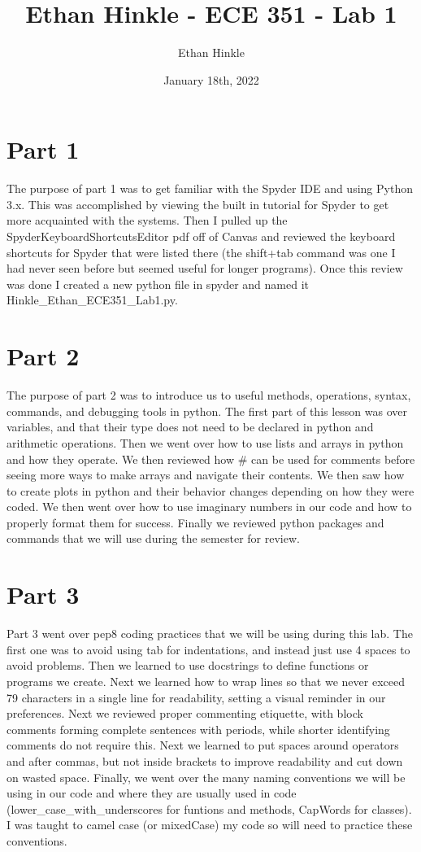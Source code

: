 \documentclass{article}
\title{Ethan Hinkle - ECE 351 - Lab 1}
\author{Ethan Hinkle}
\date{January 18th, 2022}
\begin{document}
\maketitle

\section{Part 1}
The purpose of part 1 was to get familiar with the Spyder IDE and using Python 3.x. This was accomplished by viewing the built in tutorial for Spyder to get more acquainted with the systems. Then I pulled up the SpyderKeyboardShortcutsEditor pdf off of Canvas and reviewed the keyboard shortcuts for Spyder that were listed there (the shift+tab command was one I had never seen before but seemed useful for longer programs). Once this review was done I created a new python file in spyder and named it Hinkle\_Ethan\_ECE351\_Lab1.py.
\section{Part 2}
The purpose of part 2 was to introduce us to useful methods, operations, syntax, commands, and debugging tools in python. The first part of this lesson was over variables, and that their type does not need to be declared in python and arithmetic operations. Then we went over how to use lists and arrays in python and how they operate. We then reviewed how \# can be used for comments before seeing more ways to make arrays and navigate their contents. We then saw how to create plots in python and their behavior changes depending on how they were coded. We then went over how to use imaginary numbers in our code and how to properly format them for success. Finally we reviewed python packages and commands that we will use during the semester for review.
\section{Part 3}
Part 3 went over pep8 coding practices that we will be using during this lab. The first one was to avoid using tab for indentations, and instead just use 4 spaces to avoid problems. Then we learned to use docstrings to define functions or programs we create. Next we learned how to wrap lines so that we never exceed 79 characters in a single line for readability, setting a visual reminder in our preferences. Next we reviewed proper commenting etiquette, with  block comments forming complete sentences with periods, while shorter identifying comments do not require this. Next we learned to put spaces around operators and after commas, but not inside brackets to improve readability and cut down on wasted space. Finally, we went over the many naming conventions we will be using in our code and where they are usually used in code (lower\_case\_with\_underscores for funtions and methods, CapWords for classes). I was taught to camel case (or mixedCase) my code so will need to practice these conventions.
\end{document}
